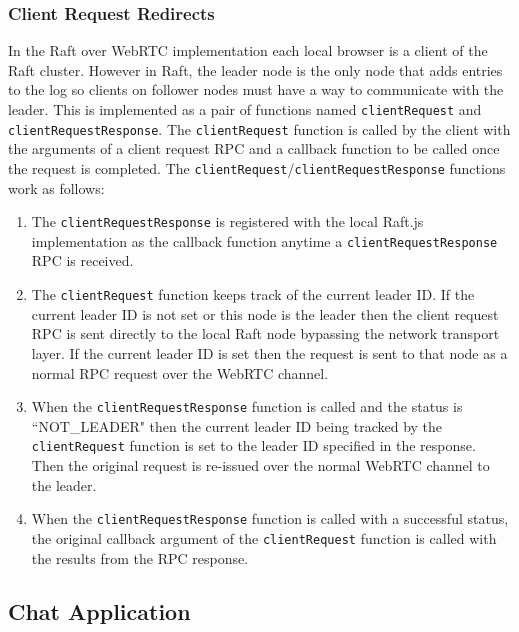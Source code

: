 \documentclass[9pt]{extarticle}
\begin{document}
\begin{multicols}{2}
\subsubsection{Client Request Redirects}


In the Raft over WebRTC implementation each local browser is a client
of the Raft cluster. However in Raft, the leader node is the only node
that adds entries to the log so clients on follower nodes must have
a way to communicate with the leader. This is implemented as a pair of
functions named \texttt{clientRequest} and
\texttt{clientRequestResponse}. The \texttt{clientRequest} function is
called by the client with the arguments of a client request RPC and
a callback function to be called once the request is completed. The
\texttt{clientRequest}/\texttt{clientRequestResponse} functions work
as follows:

\begin{enumerate}
\item The \texttt{clientRequestResponse} is registered with the local
    Raft.js implementation as the callback function anytime
    a \texttt{clientRequestResponse} RPC is received.
\item The \texttt{clientRequest} function keeps track of the current
    leader ID.  If the current leader ID is not set or this node is
    the leader then the client request RPC is sent directly to the
    local Raft node bypassing the network transport layer.  If the
    current leader ID is set then the request is sent to that node as
    a normal RPC request over the WebRTC channel.
\item When the \texttt{clientRequestResponse} function is called and
    the status is ``NOT\_LEADER" then the current leader ID being
    tracked by the \texttt{clientRequest} function is set to the
    leader ID specified in the response. Then the original request is
    re-issued over the normal WebRTC channel to the leader.
\item When the \texttt{clientRequestResponse} function is called with
    a successful status, the original callback argument of the
    \texttt{clientRequest} function is called with the results from
    the RPC response.
\end{enumerate}

\subsection{Chat Application}


\end{multicols}
\end{document}
